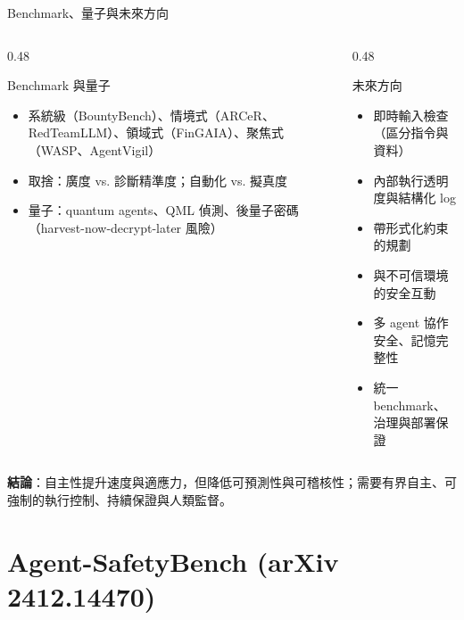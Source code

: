 \documentclass[aspectratio=169]{beamer}
\begin{document}
\begin{frame}{Benchmark、量子與未來方向}
    \footnotesize
    \begin{columns}[T]
        \begin{column}{0.48\textwidth}
            \begin{block}{Benchmark 與量子}
                \begin{itemize}
                    \item 系統級（BountyBench）、情境式（ARCeR、RedTeamLLM）、領域式（FinGAIA）、聚焦式（WASP、AgentVigil）
                    \item 取捨：廣度 vs. 診斷精準度；自動化 vs. 擬真度
                    \item 量子：quantum agents、QML 偵測、後量子密碼（harvest-now-decrypt-later 風險）
                \end{itemize}
            \end{block}
        \end{column}
        \begin{column}{0.48\textwidth}
            \begin{block}{未來方向}
                \begin{itemize}
                    \item 即時輸入檢查（區分指令與資料）
                    \item 內部執行透明度與結構化 log
                    \item 帶形式化約束的規劃
                    \item 與不可信環境的安全互動
                    \item 多 agent 協作安全、記憶完整性
                    \item 統一 benchmark、治理與部署保證
                \end{itemize}
            \end{block}
        \end{column}
    \end{columns}

    \medskip
    \small \textbf{結論}：自主性提升速度與適應力，但降低可預測性與可稽核性；需要有界自主、可強制的執行控制、持續保證與人類監督。
\end{frame}


\section{Agent-SafetyBench (arXiv 2412.14470)}
\end{document}
